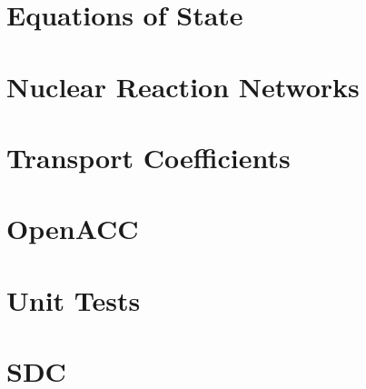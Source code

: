 \documentclass[11pt]{book}
\begin{document}



\chapter{Equations of State}
\label{chapter:eos}




\chapter{Nuclear Reaction Networks}
\label{chapter:networks}




\chapter{Transport Coefficients}
\label{chapter:transport}




\chapter{OpenACC}
\label{chapter:openacc}




\chapter{Unit Tests}




\chapter{SDC}




\backmatter

\renewcommand\bibname{References}


\end{document}
